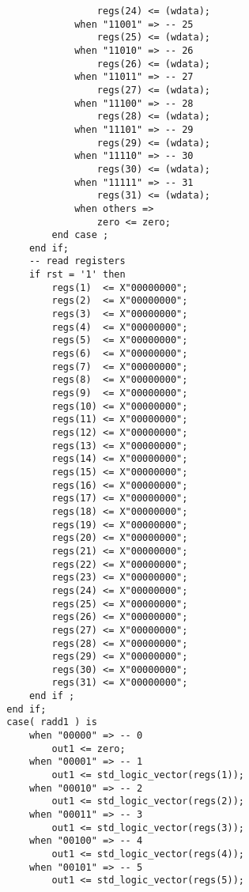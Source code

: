 \documentclass[a4paper]{article}
\begin{document}
\begin{lstlisting}
                        regs(24) <= (wdata);
                    when "11001" => -- 25
                        regs(25) <= (wdata);
                    when "11010" => -- 26
                        regs(26) <= (wdata);
                    when "11011" => -- 27
                        regs(27) <= (wdata);
                    when "11100" => -- 28
                        regs(28) <= (wdata);
                    when "11101" => -- 29
                        regs(29) <= (wdata);
                    when "11110" => -- 30
                        regs(30) <= (wdata);
                    when "11111" => -- 31
                        regs(31) <= (wdata);
                    when others =>
                        zero <= zero;
                end case ;
            end if;
            -- read registers
            if rst = '1' then
                regs(1)  <= X"00000000";
                regs(2)  <= X"00000000";
                regs(3)  <= X"00000000";
                regs(4)  <= X"00000000";
                regs(5)  <= X"00000000";
                regs(6)  <= X"00000000";
                regs(7)  <= X"00000000";
                regs(8)  <= X"00000000";
                regs(9)  <= X"00000000";
                regs(10) <= X"00000000";
                regs(11) <= X"00000000";
                regs(12) <= X"00000000";
                regs(13) <= X"00000000";
                regs(14) <= X"00000000";
                regs(15) <= X"00000000";
                regs(16) <= X"00000000";
                regs(17) <= X"00000000";
                regs(18) <= X"00000000";
                regs(19) <= X"00000000";
                regs(20) <= X"00000000";
                regs(21) <= X"00000000";
                regs(22) <= X"00000000";
                regs(23) <= X"00000000";
                regs(24) <= X"00000000";
                regs(25) <= X"00000000";
                regs(26) <= X"00000000";
                regs(27) <= X"00000000";
                regs(28) <= X"00000000";
                regs(29) <= X"00000000";
                regs(30) <= X"00000000";
                regs(31) <= X"00000000";
            end if ;
        end if;
        case( radd1 ) is
            when "00000" => -- 0
                out1 <= zero;
            when "00001" => -- 1
                out1 <= std_logic_vector(regs(1));
            when "00010" => -- 2
                out1 <= std_logic_vector(regs(2));
            when "00011" => -- 3
                out1 <= std_logic_vector(regs(3));
            when "00100" => -- 4
                out1 <= std_logic_vector(regs(4));
            when "00101" => -- 5
                out1 <= std_logic_vector(regs(5));

\end{lstlisting}
\end{document}
